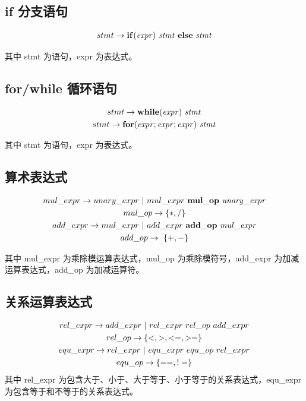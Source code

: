 \documentclass[UTF8,a4paper,10pt]{ctexart}
\begin{document}
\subsection{if 分支语句}
\begin{gather*}
  stmt\rightarrow\rm\bf{if}\it{(expr)}\ \it{stmt}\ \rm\bf{else}\ \it{stmt}
\end{gather*}

其中 stmt 为语句，expr 为表达式。

\subsection{for/while 循环语句}
\begin{gather*}
  stmt\rightarrow\rm\bf{while}\it{(expr)\ stmt}\\
  stmt\rightarrow\rm\bf{for}\it{(expr;expr;expr)\ stmt}
\end{gather*}

其中 stmt 为语句，expr 为表达式。

\subsection{算术表达式}
\begin{gather*}
  mul\_expr \rightarrow unary\_expr\ |\ mul\_expr\ \rm\bf{mul\_op}\ \it{unary\_expr}\\
  mul\_op \rightarrow \rm\bf{\{*,/\}}\\
  add\_expr\rightarrow mul\_expr\ |\ add\_expr\ \rm\bf{add\_op}\ \it{mul\_expr}\\
  add\_op \rightarrow\ \rm\bf{\{+,-\}}
\end{gather*}

其中 mul\_expr 为乘除模运算表达式，mul\_op 为乘除模符号，add\_expr 为加减运算表达式，add\_op 为加减运算符。

\subsection{关系运算表达式}
\begin{gather*}
  rel\_expr\rightarrow add\_expr\ |\ rel\_expr\ rel\_op\ add\_expr\\
  rel\_op\rightarrow \rm\bf{\{<,>,<=,>=\}}\\
  equ\_expr\rightarrow rel\_expr\ |\ equ\_expr\ equ\_op\ rel\_expr\\
  equ\_op\rightarrow \rm\bf{\{==,!=\}}
\end{gather*}
其中 rel\_expr 为包含大于、小于、大于等于、小于等于的关系表达式，equ\_expr 为包含等于和不等于的关系表达式。
\end{document}
